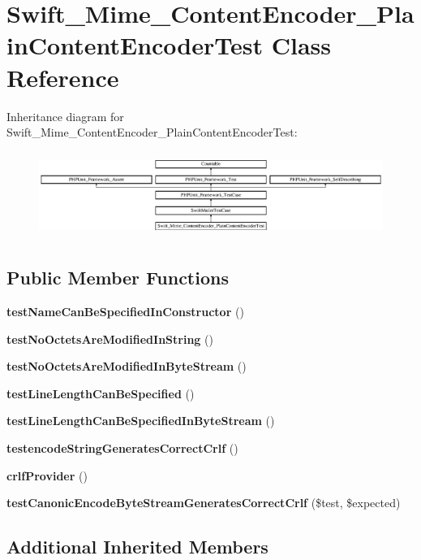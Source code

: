 \section{Swift\+\_\+\+Mime\+\_\+\+Content\+Encoder\+\_\+\+Plain\+Content\+Encoder\+Test Class Reference}
\label{class_swift___mime___content_encoder___plain_content_encoder_test}
Inheritance diagram for Swift\+\_\+\+Mime\+\_\+\+Content\+Encoder\+\_\+\+Plain\+Content\+Encoder\+Test\+:\begin{figure}[H]
\begin{center}
\leavevmode
\includegraphics[height=2.819738cm]{class_swift___mime___content_encoder___plain_content_encoder_test}
\end{center}
\end{figure}
\subsection*{Public Member Functions}
\begin{DoxyCompactItemize}
\item 
{\bf test\+Name\+Can\+Be\+Specified\+In\+Constructor} ()
\item 
{\bf test\+No\+Octets\+Are\+Modified\+In\+String} ()
\item 
{\bf test\+No\+Octets\+Are\+Modified\+In\+Byte\+Stream} ()
\item 
{\bf test\+Line\+Length\+Can\+Be\+Specified} ()
\item 
{\bf test\+Line\+Length\+Can\+Be\+Specified\+In\+Byte\+Stream} ()
\item 
{\bf testencode\+String\+Generates\+Correct\+Crlf} ()
\item 
{\bf crlf\+Provider} ()
\item 
{\bf test\+Canonic\+Encode\+Byte\+Stream\+Generates\+Correct\+Crlf} (\$test, \$expected)
\end{DoxyCompactItemize}
\subsection*{Additional Inherited Members}


